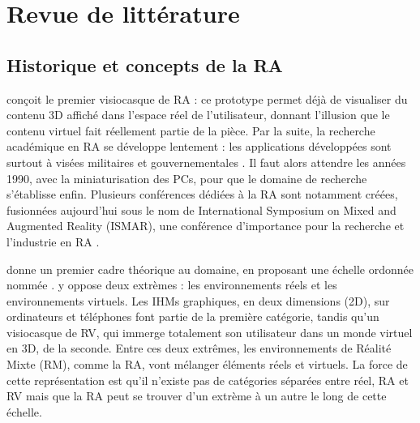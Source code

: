 \chapter{Revue de littérature}
\label{ch:litterature}

\section{Historique et concepts de la RA}
\label{sec:litterature_ar}

\cite{Sutherland1968} conçoit le premier visiocasque de RA  : ce prototype permet déjà de visualiser du contenu 3D affiché dans l'espace réel de l'utilisateur, donnant l'illusion que le contenu virtuel fait réellement partie de la pièce. Par la suite, la recherche académique en RA se développe lentement : les applications développées sont surtout à visées militaires et gouvernementales \citep{VanKrevelen2010}. Il faut alors attendre les années 1990, avec la miniaturisation des PCs, pour que le domaine de recherche s'établisse enfin. Plusieurs conférences dédiées à la RA sont notamment créées, fusionnées aujourd'hui sous le nom de International Symposium on Mixed and Augmented Reality (ISMAR), une conférence d'importance pour la recherche et l'industrie en RA \citep{Azuma2001}.


\cite{Milgram1994} donne un premier cadre théorique au domaine, en proposant une échelle ordonnée nommée  . \citeauthor{Milgram1994} y oppose deux extrèmes : les environnements réels et les environnements virtuels. Les IHMs graphiques, en deux dimensions (2D), sur ordinateurs et téléphones font partie de la première catégorie, tandis qu'un visiocasque de RV, qui immerge totalement son utilisateur dans un monde virtuel en 3D, de la seconde. Entre ces deux extrêmes, les environnements de Réalité Mixte (RM), comme la RA, vont mélanger éléments réels et virtuels. La force de cette représentation est qu'il n'existe pas de catégories séparées entre réel, RA et RV mais que la RA peut se trouver d'un extrème à un autre le long de cette échelle.

